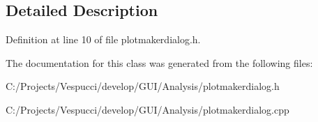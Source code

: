 \subsection{Detailed Description}


Definition at line 10 of file plotmakerdialog.\+h.



The documentation for this class was generated from the following files\+:\begin{DoxyCompactItemize}
\item 
C\+:/\+Projects/\+Vespucci/develop/\+G\+U\+I/\+Analysis/plotmakerdialog.\+h\item 
C\+:/\+Projects/\+Vespucci/develop/\+G\+U\+I/\+Analysis/plotmakerdialog.\+cpp\end{DoxyCompactItemize}
